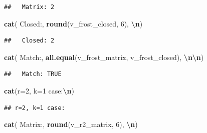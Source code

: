 \documentclass[
]{article}
\newenvironment{Shaded}{\begin{snugshade}}{\end{snugshade}}
\newcommand{\DecValTok}[1]{\textcolor[rgb]{0.00,0.00,0.81}{#1}}
\newcommand{\FunctionTok}[1]{\textcolor[rgb]{0.13,0.29,0.53}{\textbf{#1}}}
\newcommand{\NormalTok}[1]{#1}
\newcommand{\SpecialCharTok}[1]{\textcolor[rgb]{0.81,0.36,0.00}{\textbf{#1}}}
\newcommand{\StringTok}[1]{\textcolor[rgb]{0.31,0.60,0.02}{#1}}
\begin{document}
\begin{verbatim}
##   Matrix: 2
\end{verbatim}

\begin{Shaded}
\begin{Highlighting}[]
\FunctionTok{cat}\NormalTok{(}\StringTok{\textquotesingle{}  Closed:\textquotesingle{}}\NormalTok{, }\FunctionTok{round}\NormalTok{(v\_frost\_closed, }\DecValTok{6}\NormalTok{), }\StringTok{\textquotesingle{}}\SpecialCharTok{\textbackslash{}n}\StringTok{\textquotesingle{}}\NormalTok{)}
\end{Highlighting}
\end{Shaded}

\begin{verbatim}
##   Closed: 2
\end{verbatim}

\begin{Shaded}
\begin{Highlighting}[]
\FunctionTok{cat}\NormalTok{(}\StringTok{\textquotesingle{}  Match:\textquotesingle{}}\NormalTok{,}
    \FunctionTok{all.equal}\NormalTok{(v\_frost\_matrix, v\_frost\_closed), }\StringTok{\textquotesingle{}}\SpecialCharTok{\textbackslash{}n\textbackslash{}n}\StringTok{\textquotesingle{}}\NormalTok{)}
\end{Highlighting}
\end{Shaded}

\begin{verbatim}
##   Match: TRUE
\end{verbatim}

\begin{Shaded}
\begin{Highlighting}[]
\FunctionTok{cat}\NormalTok{(}\StringTok{\textquotesingle{}r=2, k=1 case:}\SpecialCharTok{\textbackslash{}n}\StringTok{\textquotesingle{}}\NormalTok{)}
\end{Highlighting}
\end{Shaded}

\begin{verbatim}
## r=2, k=1 case:
\end{verbatim}

\begin{Shaded}
\begin{Highlighting}[]
\FunctionTok{cat}\NormalTok{(}\StringTok{\textquotesingle{}  Matrix:\textquotesingle{}}\NormalTok{, }\FunctionTok{round}\NormalTok{(v\_r2\_matrix, }\DecValTok{6}\NormalTok{), }\StringTok{\textquotesingle{}}\SpecialCharTok{\textbackslash{}n}\StringTok{\textquotesingle{}}\NormalTok{)}
\end{Highlighting}
\end{Shaded}
\end{document}
